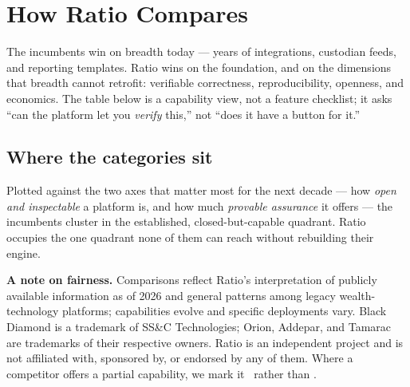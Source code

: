 \section{How Ratio Compares}

The incumbents win on breadth today --- years of integrations, custodian feeds,
and reporting templates. Ratio wins on the foundation, and on the dimensions that
breadth cannot retrofit: verifiable correctness, reproducibility, openness, and
economics. The table below is a capability view, not a feature checklist;
it asks ``can the platform let you \emph{verify} this,'' not ``does it have a
button for it.''



\subsection{Where the categories sit}
Plotted against the two axes that matter most for the next decade --- how
\emph{open and inspectable} a platform is, and how much \emph{provable assurance}
it offers --- the incumbents cluster in the established, closed-but-capable
quadrant. Ratio occupies the one quadrant none of them can reach without
rebuilding their engine.



\begin{callout}
\footnotesize\color{ratioInk}
\textbf{A note on fairness.} Comparisons reflect Ratio's interpretation of
publicly available information as of 2026 and general patterns among legacy
wealth-technology platforms; capabilities evolve and specific deployments vary.
Black Diamond is a trademark of SS\&C Technologies; Orion, Addepar, and Tamarac
are trademarks of their respective owners. Ratio is an independent project and is
not affiliated with, sponsored by, or endorsed by any of them. Where a competitor
offers a partial capability, we mark it \partialmark\ rather than \no.
\end{callout}

